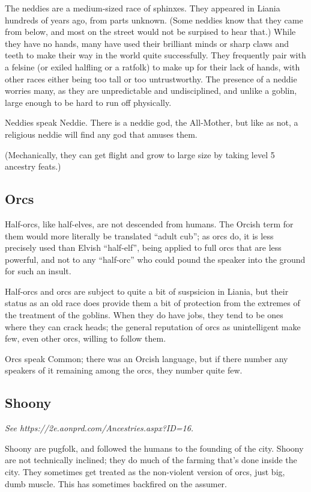 \documentclass{report}
\begin{document}
The neddies are a medium-sized race of sphinxes. They appeared in Liania hundreds
of years ago, from parts unknown. (Some neddies know that they came from below,
and most on the street would not be surpised to hear that.) While they have no
hands, many have used their brilliant minds or sharp claws and teeth to make their
way in the world quite successfully. They frequently pair with a felsine (or
exiled halfling or a ratfolk) to make up for their lack of hands, with other
races either being too tall or too untrustworthy. The presence of a neddie
worries many, as they are unpredictable and undisciplined, and unlike a goblin,
large enough to be hard to run off physically.

Neddies speak Neddie. There is a neddie god, the All-Mother, but like as not, a
religious neddie will find any god that amuses them.

(Mechanically, they can get flight and grow to large size by taking level 5 ancestry
feats.)

\subsection{Orcs}

Half-orcs, like half-elves, are not descended from humans. The Orcish term for
them would more literally be translated ``adult cub''; as orcs do, it is less
precisely used than Elvish ``half-elf'', being applied to full orcs that are less powerful, and not to
any ``half-orc'' who could pound the speaker into the ground for such an insult.

Half-orcs and orcs are subject to quite a bit of suspsicion in Liania, but their
status as an old race does provide them a bit of protection from the extremes
of the treatment of the goblins. When they do have jobs, they tend to be ones
where they can crack heads; the general reputation of orcs as unintelligent
make few, even other orcs, willing to follow them.

Orcs speak Common; there was an Orcish language, but if there number any speakers
of it remaining among the orcs, they number quite few.

\subsection{Shoony}

\emph{See https://2e.aonprd.com/Ancestries.aspx?ID=16.}

Shoony are pugfolk, and followed the humans to the founding of the city. Shoony
are not technically inclined; they do much of the farming that's done inside the
city. They sometimes get treated as the non-violent version of orcs, just big,
dumb muscle. This has sometimes backfired on the assumer.
\end{document}
